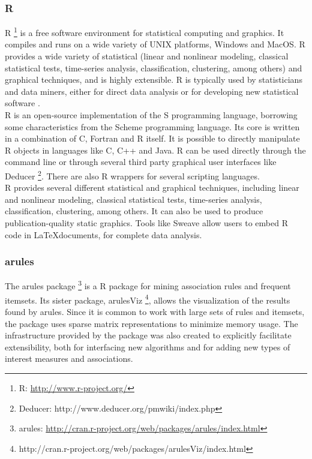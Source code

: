 \subsubsection{R}
R \footnote{R: \url{http://www.r-project.org/}} is a free software environment for statistical computing and graphics. It compiles and runs on a wide variety of UNIX platforms, Windows and MacOS. R provides a wide variety of statistical (linear and nonlinear modeling, classical statistical tests, time-series analysis, classification, clustering, among others) and graphical techniques, and is highly extensible.  R is typically used by statisticians and data miners, either for direct data analysis or for developing new statistical software \cite{fox2005using}.\\
R is an open-source implementation of the S programming language, borrowing some characteristics from the Scheme programming language. Its core is written in a combination of C, Fortran and R itself. It is possible to directly manipulate R objects in languages like C, C++ and Java. R can be used directly through the command line or through several third party graphical user interfaces like Deducer \footnote{Deducer: http://www.deducer.org/pmwiki/index.php}. There are also R wrappers for several scripting languages.\\
R provides several different statistical and graphical techniques, including linear and nonlinear modeling, classical statistical tests, time-series analysis, classification, clustering, among others. It can also be used to produce publication-quality static graphics. Tools like Sweave \cite{leisch2002sweave} allow users to embed R code in \LaTeX documents, for complete data analysis.

\subsubsection*{arules}
The arules package \footnote{arules: \url{http://cran.r-project.org/web/packages/arules/index.html}} is a R package for mining association rules and frequent itemsets. Its sister package, arulesViz \footnote{http://cran.r-project.org/web/packages/arulesViz/index.html}, allows the visualization of the results found by arules. Since it is common to work with large sets of rules and itemsets, the package uses sparse matrix representations to minimize memory usage. The infrastructure provided by the package was also created to explicitly facilitate extensibility, both for interfacing new algorithms and for adding new types of interest measures and associations.

